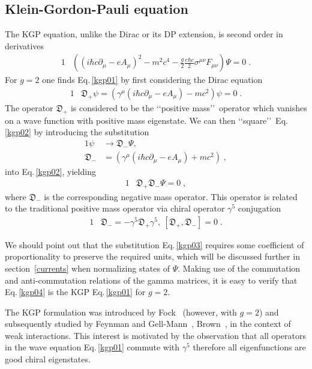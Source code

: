 \documentclass[epj]{svjour}
\begin{document}
\subsection{Klein-Gordon-Pauli equation} \label{kgp}
The KGP equation, unlike the Dirac or its DP extension, is second order in derivatives 
\begin{alignat}{1}
\label{kgp01} &\left(\left(i\hbar c\partial_{\mu}-eA_{\mu}\right)^{2}-m^{2}c^{4}-\frac{g}{2}\frac{e\hbar c}{2}\sigma^{\mu\nu}F_{\mu\nu}\right)\Psi=0\;.
\end{alignat} 
For $g=2$ one finds Eq.\,\eqref{kgp01} by first considering the Dirac equation
\begin{alignat}{1}
\label{kgp02} &\mathfrak{D}_{+}\psi=\left(\gamma^{\mu}\left(i\hbar c\partial_{\mu}-eA_{\mu}\right)-mc^{2}\right)\psi=0\;.
\end{alignat}
The operator $\mathfrak{D}_{+}$ is considered to be the \lq\lq positive mass\rq\rq\ operator which vanishes on a wave function with positive mass eigenstate. We can then \lq\lq square\rq\rq\ Eq.\,\eqref{kgp02} by introducing the substitution
\begin{alignat}{1}
\label{kgp03} \psi&\rightarrow\mathfrak{D}_{-}\Psi,\\ 
\label{kgp03b} \mathfrak{D}_{-}&=\left(\gamma^{\mu}\left(i\hbar c\partial_{\mu}-eA_{\mu}\right)+mc^{2}\right)\;,\end{alignat}
into Eq.\,\eqref{kgp02}, yielding
\begin{alignat}{1}
\label{kgp04} &\mathfrak{D}_{+}\mathfrak{D}_{-}\Psi=0\;,
\end{alignat}
where $\mathfrak{D}_{-}$ is the corresponding negative mass operator. This operator is related to the traditional positive mass operator via chiral operator $\gamma^{5}$ conjugation
\begin{alignat}{1}
\label{kgp05} &\mathfrak{D}_{-}=-\gamma^{5}\mathfrak{D}_{+}\gamma^{5},\ [\mathfrak{D}_{+},\mathfrak{D}_{-}]=0\;.
\end{alignat}


We should point out that the substitution Eq.\,\eqref{kgp03} requires some coefficient of proportionality to preserve the required units, which will be discussed further in section~\ref{currents} when normalizing states of $\Psi$. Making use of the commutation and anti-commutation relations of the gamma matrices, it is easy to verify that Eq.\,\eqref{kgp04} is the KGP Eq.\,\eqref{kgp01} for $g=2$. 

The KGP formulation was introduced by Fock~\cite{Fock:1937dy} (however, with $g=2$) and subsequently studied by Feynman and Gell-Mann~\cite{Feynman:1958ty}, Brown~\cite{Brown:1958zz}, in the context of weak interactions. This interest is motivated by the observation that all operators in the wave equation Eq.\,\eqref{kgp01} commute with $\gamma^{5}$ therefore all eigenfunctions are good chiral eigenstates. 
\end{document}
